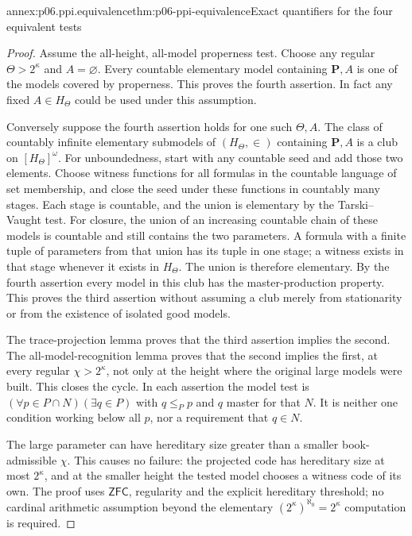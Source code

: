 \begin{annexitem}{annex:p06.ppi.equivalence}{thm:p06-ppi-equivalence}{Exact quantifiers for the four equivalent tests}
\begin{proof}
Assume the all-height, all-model properness test. Choose any regular
\(\Theta>2^\kappa\) and \(A=\varnothing\). Every countable elementary
model containing \(\mathbf P,A\) is one of the models covered by
properness. This proves the fourth assertion. In fact any fixed
\(A\in H_\Theta\) could be used under this assumption.

Conversely suppose the fourth assertion holds for one such
\(\Theta,A\). The class of countably infinite elementary submodels
of \((H_\Theta,\in)\) containing \(\mathbf P,A\) is a club on
\([H_\Theta]^\omega\). For unboundedness, start with any countable
seed and add those two elements. Choose witness functions for all
formulas in the countable language of set membership, and close the
seed under these functions in countably many stages. Each stage is
countable, and the union is elementary by the Tarski--Vaught test.
For closure, the union of an increasing countable chain of these
models is countable and still contains the two parameters. A formula
with a finite tuple of parameters from that union has its tuple in
one stage; a witness exists in that stage whenever it exists in
\(H_\Theta\). The union is therefore elementary. By the fourth
assertion every model in this club has the master-production property.
This proves the third assertion without assuming a club merely from
stationarity or from the existence of isolated good models.

The trace-projection lemma proves that the third assertion implies
the second. The all-model-recognition lemma proves that the second
implies the first, at every regular \(\chi>2^\kappa\), not only at
the height where the original large models were built. This closes
the cycle. In each assertion the model test is
\((\forall p\in P\cap N)(\exists q\in P)\) with \(q\leq_P p\)
and \(q\) master for that \(N\). It is neither one condition working
below all \(p\), nor a requirement that \(q\in N\).

The large parameter can have hereditary size greater than a smaller
book-admissible \(\chi\). This causes no failure: the projected code
has hereditary size at most \(2^\kappa\), and at the smaller height
the tested model chooses a witness code of its own. The proof uses
\(\mathsf{ZFC}\), regularity and the explicit hereditary threshold;
no cardinal arithmetic assumption beyond the elementary
\((2^\kappa)^{\aleph_0}=2^\kappa\) computation is required.
\end{proof}
\end{annexitem}

